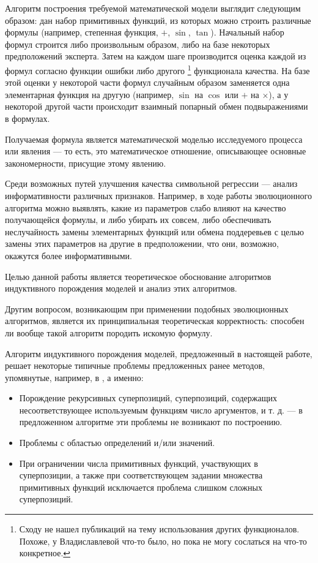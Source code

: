 \documentclass[12pt,a4paper]{amsart}
\begin{document}
Алгоритм построения требуемой математической модели выглядит следующим образом:
дан набор примитивных функций, из которых можно строить различные формулы
(например, степенная функция, $+$, $\sin$, $\tan$). Начальный набор формул
строится либо произвольным образом, либо на базе некоторых предположений
эксперта. Затем на каждом шаге производится оценка каждой из формул согласно
функции ошибки либо другого \footnote{Сходу не нашел публикаций на тему
использования других функционалов. Похоже, у Владиславлевой что-то было, но
пока не могу сослаться на что-то конкретное.} функционала качества. На базе
этой оценки у некоторой части формул случайным образом заменяется одна элементарная
функция на другую (например, $\sin$ на $\cos$ или $+$ на $\times$), а у некоторой
другой части происходит взаимный попарный обмен подвыражениями в формулах.

Получаемая формула является математической моделью \cite{Pavlovsky2000}
исследуемого процесса или явления --- то есть, это математическое отношение,
описывающее основные закономерности, присущие этому явлению.

Среди возможных путей улучшения качества символьной регрессии --- анализ
информативности различных признаков. Например, в ходе работы эволюционного
алгоритма можно выявлять, какие из параметров слабо влияют на качество
получающейся формулы, и либо убирать их совсем, либо обеспечивать
неслучайность замены элементарных функций или обмена поддеревьев с целью
замены этих параметров на другие в предположении, что они, возможно,
окажутся более информативными.

Целью данной работы является теоретическое обоснование алгоритмов индуктивного
порождения моделей и анализ этих алгоритмов.

Другим вопросом, возникающим при применении подобных эволюционных алгоритмов,
является их принципиальная теоретическая корректность: способен ли вообще
такой алгоритм породить искомую формулу.

Алгоритм индуктивного порождения моделей, предложенный в настоящей работе, решает
некоторые типичные проблемы предложенных ранее методов, упомянутые, например,
в \cite{Zelinka2008}, а именно:
\begin{itemize}
  \item Порождение рекурсивных суперпозиций, суперпозиций, содержащих
	несоответствующее используемым функциям число аргументов, и т. д. --- в
	предложенном алгоритме эти проблемы не возникают по построению.
  \item Проблемы с областью определений и/или значений.
  \item При ограничении числа примитивных функций, участвующих в суперпозиции,
	а также при соответствующем задании множества примитивных функций
	исключается проблема слишком сложных суперпозиций.
\end{itemize}
\end{document}
